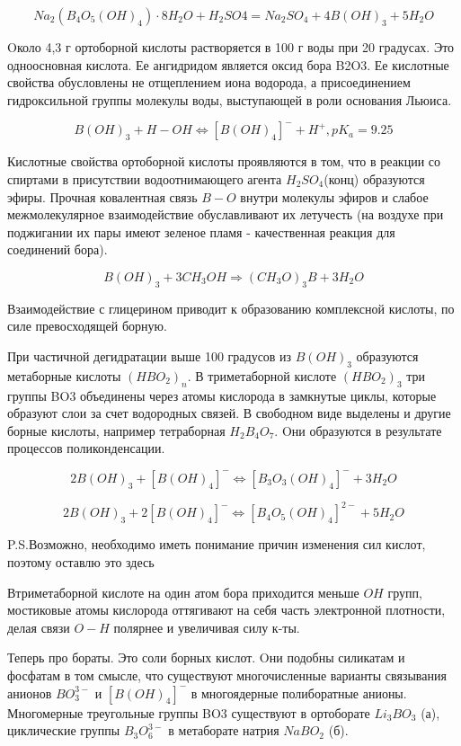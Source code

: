 \documentclass[11pt]{article}
\begin{document}
$$Na_2(B_4O_5(OH)_4)\cdot 8H_2O + H_2SO4 = Na_2SO_4 + 4B(OH)_3 + 5H_2O$$

Oколо 4,3 г ортоборной кислоты растворяется в 100 г воды при 20 градусах. Это
одноосновная кислота. Ее ангидридом является оксид бора B2O3. Ее кислотные свойства
обусловлены не отщеплением иона водорода, а присоединением гидроксильной группы
молекулы воды, выступающей в роли основания Льюиса.

$$B(OH)_3 + H-OH \Leftrightarrow [B(OH)_4]^- + H^+, pK_a=9.25$$

Кислотные свойства ортоборной кислоты проявляются в том, что в реакции со спиртами в
присутствии водоотнимающего агента $H_2SO_4$(конц) образуются эфиры. Прочная
ковалентная связь $B-O$ внутри молекулы эфиров и слабое межмолекулярное
взаимодействие обуславливают их летучесть (на воздухе при поджигании их пары имеют
зеленое пламя - качественная реакция для соединений бора).

$$B(OH)_3 + 3CH_3OH \Rightarrow (CH_3O)_3B + 3H_2O$$

Взаимодействие с глицерином приводит к образованию комплексной кислоты, по силе
превосходящей борную.

При частичной дегидратации выше 100 градусов из $B(OH)_3$ образуются метаборные
кислоты $(HBO_2)_n$. В триметаборной кислоте $(HBO_2)_3$ три группы
BO3 объединены через атомы кислорода в замкнутые циклы,
которые образуют слои за счет водородных связей.
В свободном виде выделены и другие борные кислоты, например
тетраборная $H_2B_4O_7$. Oни образуются в результате процессов
поликонденсации.

$$2B(OH)_3 + [B(OH)_4]^- \Leftrightarrow [B_3O_3(OH)_4]^- + 3H_2O$$

$$2B(OH)_3 + 2[B(OH)_4]^- \Leftrightarrow [B_4O_5(OH)_4]^{2-} + 5H_2O$$



P.S.Возможно, необходимо иметь понимание причин изменения сил кислот, поэтому
оставлю это здесь

Втриметаборной кислоте на один атом бора приходится меньше $OH$ групп, мостиковые атомы кислорода оттягивают на себя часть электронной плотности, делая связи $O-H$ полярнее и увеличивая силу к-ты.



Теперь про бораты. Это соли борных кислот. Oни подобны силикатам и фосфатам в том
смысле, что существуют многочисленные варианты связывания анионов $BO_3 ^{3-}$ и $[B(OH)_4]^-$
в многоядерные полиборатные анионы.
Многомерные треугольные группы BO3 существуют в ортоборате $Li_3BO_3$ (а), циклические
группы $B_3O_6 ^{3-}$ в метаборате натрия $NaBO_2$ (б).
\end{document}
